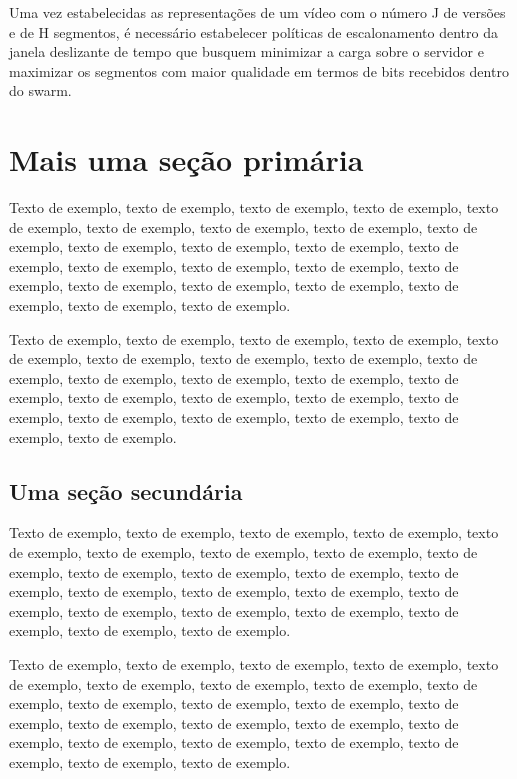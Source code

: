 \documentclass[
	12pt,				%
	oneside,			%
	a4paper,			%
	english,			%
	brazil				%
	]{abntex2ppgsi}
\begin{document}
Uma vez estabelecidas as representações de um vídeo com o número J de versões e de H segmentos, é necessário estabelecer políticas de escalonamento dentro da janela deslizante de tempo que busquem minimizar a carga sobre o servidor e maximizar os segmentos com maior qualidade em termos de bits recebidos dentro do swarm.



\chapter{Mais uma seção primária}

Texto de exemplo, texto de exemplo, texto de exemplo, texto de exemplo, texto de exemplo, texto de exemplo, texto de exemplo, texto de exemplo, texto de exemplo, texto de exemplo, texto de exemplo, texto de exemplo, texto de exemplo, texto de exemplo, texto de exemplo, texto de exemplo, texto de exemplo, texto de exemplo, texto de exemplo, texto de exemplo, texto de exemplo, texto de exemplo, texto de exemplo.

Texto de exemplo, texto de exemplo, texto de exemplo, texto de exemplo, texto de exemplo, texto de exemplo, texto de exemplo, texto de exemplo, texto de exemplo, texto de exemplo, texto de exemplo, texto de exemplo, texto de exemplo, texto de exemplo, texto de exemplo, texto de exemplo, texto de exemplo, texto de exemplo, texto de exemplo, texto de exemplo, texto de exemplo, texto de exemplo.

\section{Uma seção secundária}

Texto de exemplo, texto de exemplo, texto de exemplo, texto de exemplo, texto de exemplo, texto de exemplo, texto de exemplo, texto de exemplo, texto de exemplo, texto de exemplo, texto de exemplo, texto de exemplo, texto de exemplo, texto de exemplo, texto de exemplo, texto de exemplo, texto de exemplo, texto de exemplo, texto de exemplo, texto de exemplo, texto de exemplo, texto de exemplo, texto de exemplo.

Texto de exemplo, texto de exemplo, texto de exemplo, texto de exemplo, texto de exemplo, texto de exemplo, texto de exemplo, texto de exemplo, texto de exemplo, texto de exemplo, texto de exemplo, texto de exemplo, texto de exemplo, texto de exemplo, texto de exemplo, texto de exemplo, texto de exemplo, texto de exemplo, texto de exemplo, texto de exemplo, texto de exemplo, texto de exemplo, texto de exemplo.
\end{document}
